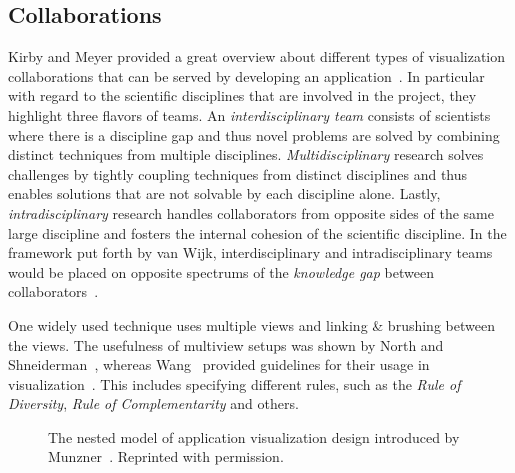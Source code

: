 \subsection{Collaborations} \label{cha:intro:appl:collab}
Kirby and Meyer provided a great overview about different types of visualization collaborations that can be served by developing an application~\cite{kirby2013visualization}.  In particular with regard to the scientific disciplines that are involved in the project, they highlight three flavors of teams. An \emph{interdisciplinary team} consists of scientists where there is a discipline gap and thus novel problems are solved by combining distinct techniques from multiple disciplines.  \emph{Multidisciplinary} research solves challenges by tightly coupling techniques from distinct disciplines and thus enables solutions that are not solvable by each discipline alone.  Lastly, \emph{intradisciplinary} research handles collaborators from opposite sides of the same large discipline and fosters the internal cohesion of the scientific discipline.  In the framework put forth by van Wijk, interdisciplinary and intradisciplinary teams would be placed on opposite spectrums of the \emph{knowledge gap} between collaborators~\cite{van2006bridging}.

One widely used technique uses multiple views and linking \& brushing between the views.  The usefulness of multiview setups was shown by North and Shneiderman~\cite{north1997taxonomy}, whereas Wang \etal\ provided guidelines for their usage in visualization~\cite{wang2000guidelines}.  This includes specifying different rules, such as the \emph{Rule of Diversity}, \emph{Rule of Complementarity} and others.

\begin{figure}
  \centering
  \caption{The nested model of application visualization design introduced by Munzner~\cite{munzner2009nested}.  Reprinted with permission.}
  \label{fig:intro:appl:nested}
\end{figure}


